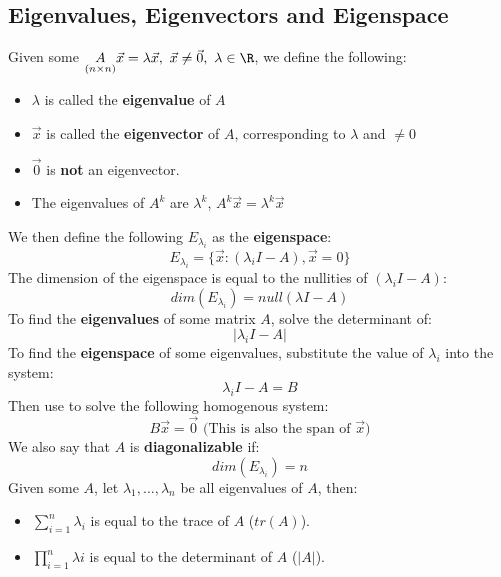 \documentclass[a4paper]{article}
\begin{document}
  \subsection{Eigenvalues, Eigenvectors and Eigenspace}
  Given some $\underset{(n\times n)}{A} \vec{x} = \lambda \vec{x}, \ \vec{x} \neq \vec{0}, \ \lambda \in \R$, we define the following:
  \begin{itemize}
    \item $\lambda$ is called the \textbf{eigenvalue} of $A$
    \item $\vec{x}$ is called the \textbf{eigenvector} of $A$, corresponding to $\lambda$ and $\neq 0$
    \item $\vec{0}$ is \textbf{not} an eigenvector.
    \item The eigenvalues of $A^k$ are $\lambda^k$, $A^k \vec{x} = \lambda^k \vec{x}$
  \end{itemize}
  We then define the following $E_{\lambda_i}$ as the \textbf{eigenspace}:
  \[
    E_{\lambda_i} = \{\vec{x}: (\lambda_i I - A), \vec{x} = 0\}
  \]
  The dimension of the eigenspace is equal to the nullities of $(\lambda_i I -A)$:
  \[
    dim(E_{\lambda_i}) = null(\lambda I -A)
  \]
  To find the \textbf{eigenvalues} of some matrix $A$, solve the determinant of:
  \[
    |\lambda_i I - A|
  \]
  To find the \textbf{eigenspace} of some eigenvalues, substitute the value of $\lambda_i$ into the system:
  \[
    \lambda_i I - A = B
  \]
  Then use to solve the following homogenous system:
  \[
    B \vec{x} = \vec{0} \textrm{ (This is also the span of $\vec{x}$)}
  \]
  We also say that $A$ is \textbf{diagonalizable} if:
  \[
    dim(E_{\lambda_i}) = n
  \]
  Given some $A$, let $\lambda_1, \dots, \lambda_n$ be all eigenvalues of $A$, then:
  \begin{itemize}
    \item $\sum_{i=1}^n \lambda_i$ is equal to the trace of $A$ ($tr(A)$).
    \item $\prod_{i=1}^n \lambda{i}$ is equal to the determinant of $A$ ($|A|$).
  \end{itemize}
\end{document}
